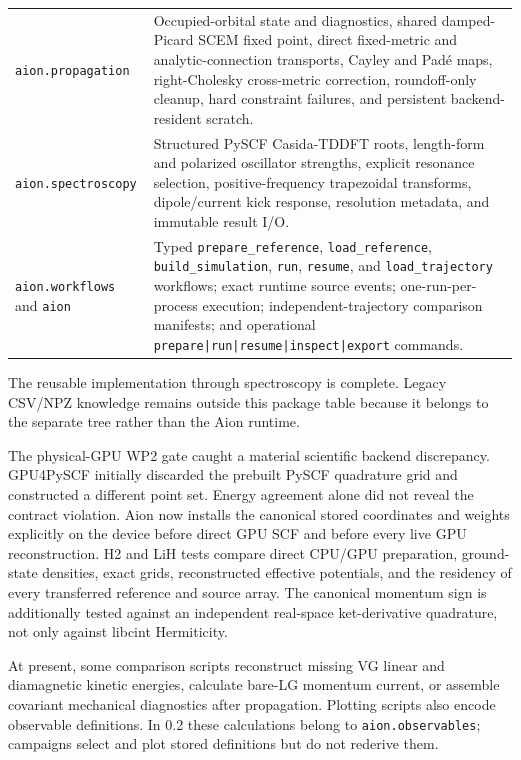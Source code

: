\documentclass[11pt]{article}
\newcommand{\code}[1]{\texttt{#1}}
\begin{document}
\begin{longtable}{@{}p{}p{}@{}}
\code{aion.propagation} &
Occupied-orbital state and diagnostics, shared damped-Picard SCEM fixed point,
direct fixed-metric and analytic-connection transports, Cayley and Pad\'e maps,
right-Cholesky cross-metric correction, roundoff-only cleanup, hard constraint
failures, and persistent backend-resident scratch.\\
\code{aion.spectroscopy} &
Structured PySCF Casida-TDDFT roots, length-form and polarized oscillator
strengths, explicit resonance selection, positive-frequency trapezoidal
transforms, dipole/current kick response, resolution metadata, and immutable
result I/O.\\
\code{aion.workflows} and \code{aion} &
Typed \code{prepare\_reference}, \code{load\_reference},
\code{build\_simulation}, \code{run}, \code{resume}, and
\code{load\_trajectory} workflows; exact runtime source events; one-run-per-
process execution; independent-trajectory comparison manifests; and operational
\code{prepare|run|resume|inspect|export} commands.\\
\bottomrule
\end{longtable}

The reusable implementation through spectroscopy is complete. Legacy
CSV/NPZ knowledge remains outside this package table because it belongs to the
separate  tree rather than the Aion
runtime.

The physical-GPU WP2 gate caught a material scientific backend discrepancy.
GPU4PySCF initially discarded the prebuilt PySCF quadrature grid and
constructed a different point set. Energy agreement alone did not reveal the
contract violation. Aion now installs the canonical stored coordinates and
weights explicitly on the device before direct GPU SCF and before every live
GPU reconstruction. H2 and LiH tests compare direct CPU/GPU preparation,
ground-state densities, exact grids, reconstructed effective potentials, and
the residency of every transferred reference and source array. The canonical
momentum sign is additionally tested against an independent real-space
ket-derivative quadrature, not only against libcint Hermiticity.

At present, some comparison scripts reconstruct missing VG linear and
diamagnetic kinetic energies, calculate bare-LG momentum current, or assemble
covariant mechanical diagnostics after propagation. Plotting scripts also
encode observable definitions. In 0.2 these calculations belong to
\code{aion.observables}; campaigns select and plot stored definitions but do
not rederive them.
\end{document}
